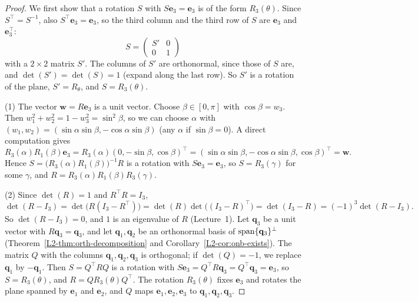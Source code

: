 \begin{proof}
    We first show that a rotation $S$ with $S\mathbf{e}_3 = \mathbf{e}_3$ is of the form $R_3(\theta)$. Since $S^\top = S^{-1}$, also $S^\top \mathbf{e}_3 = \mathbf{e}_3$, so the third column and the third row of $S$ are $\mathbf{e}_3$ and $\mathbf{e}_3^\top$:
    \[S = \begin{pmatrix} S' & 0 \\ 0 & 1 \end{pmatrix}\]
    with a $2 \times 2$ matrix $S'$. The columns of $S'$ are orthonormal, since those of $S$ are, and $\det(S') = \det(S) = 1$ (expand along the last row). So $S'$ is a rotation of the plane, $S' = R_\theta$, and $S = R_3(\theta)$.

    (1) The vector $\mathbf{w} = R\mathbf{e}_3$ is a unit vector. Choose $\beta \in [0, \pi]$ with $\cos\beta = w_3$. Then $w_1^2 + w_2^2 = 1 - w_3^2 = \sin^2\beta$, so we can choose $\alpha$ with $(w_1, w_2) = (\sin\alpha\sin\beta, -\cos\alpha\sin\beta)$ (any $\alpha$ if $\sin\beta = 0$). A direct computation gives
    \[R_3(\alpha)R_1(\beta)\mathbf{e}_3 = R_3(\alpha)(0, -\sin\beta, \cos\beta)^\top = (\sin\alpha\sin\beta, -\cos\alpha\sin\beta, \cos\beta)^\top = \mathbf{w}.\]
    Hence $S = \big(R_3(\alpha)R_1(\beta)\big)^{-1}R$ is a rotation with $S\mathbf{e}_3 = \mathbf{e}_3$, so $S = R_3(\gamma)$ for some $\gamma$, and $R = R_3(\alpha)R_1(\beta)R_3(\gamma)$.

    (2) Since $\det(R) = 1$ and $R^\top R = I_3$,
    \[\det(R - I_3) = \det\big(R(I_3 - R^\top)\big) = \det(R)\det\big((I_3 - R)^\top\big) = \det(I_3 - R) = (-1)^3\det(R - I_3).\]
    So $\det(R - I_3) = 0$, and $1$ is an eigenvalue of $R$ (Lecture~1). Let $\mathbf{q}_3$ be a unit vector with $R\mathbf{q}_3 = \mathbf{q}_3$, and let $\mathbf{q}_1, \mathbf{q}_2$ be an orthonormal basis of $\operatorname{span}\{\mathbf{q}_3\}^\perp$ (Theorem~\ref{L2-thm:orth-decomposition} and Corollary~\ref{L2-cor:onb-exists}). The matrix $Q$ with the columns $\mathbf{q}_1, \mathbf{q}_2, \mathbf{q}_3$ is orthogonal; if $\det(Q) = -1$, we replace $\mathbf{q}_1$ by $-\mathbf{q}_1$. Then $S = Q^\top RQ$ is a rotation with $S\mathbf{e}_3 = Q^\top R\mathbf{q}_3 = Q^\top \mathbf{q}_3 = \mathbf{e}_3$, so $S = R_3(\theta)$, and $R = QR_3(\theta)Q^\top$. The rotation $R_3(\theta)$ fixes $\mathbf{e}_3$ and rotates the plane spanned by $\mathbf{e}_1$ and $\mathbf{e}_2$, and $Q$ maps $\mathbf{e}_1, \mathbf{e}_2, \mathbf{e}_3$ to $\mathbf{q}_1, \mathbf{q}_2, \mathbf{q}_3$.
\end{proof}

